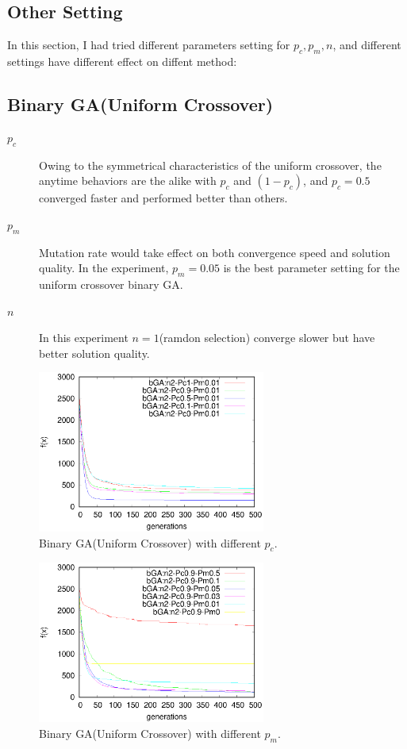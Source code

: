 ﻿\documentclass[conference]{IEEEtran}
\begin{document}
\begin{CJK}{UTF8}{bsmi}
\section{Other Setting}
In this section, I had tried different parameters setting for $p_{c}, p_{m}, n$, and different settings have different effect on diffent method: 

\subsection{Binary GA(Uniform Crossover)}
\begin{description}
\item [$p_{c}$] Owing to the symmetrical characteristics of the uniform crossover, the anytime behaviors are the alike with $p_c$ and $(1-p_c)$, and $p_c=0.5$ converged faster and performed better than others.
\item [$p_{m}$] Mutation rate would take effect on both convergence speed and solution quality. In the experiment, $p_m=0.05$ is the best parameter setting for the uniform crossover binary GA.
\item [$n$] In this experiment $n=1$(ramdon selection) converge slower but have better solution quality.
\end{description}

\begin{figure}[htbp]
\centerline{\includegraphics[width=7.5cm]{fig/bGA/change_pc_uni.eps}}
\caption{Binary GA(Uniform Crossover) with different $p_{c}$.}
\label{fig}
\end{figure}

\begin{figure}[htbp]
\centerline{\includegraphics[width=7.5cm]{fig/bGA/change_pm_uni.eps}}
\caption{Binary GA(Uniform Crossover) with different $p_{m}$.}
\label{fig}
\end{figure}


\end{CJK}
\end{document}
